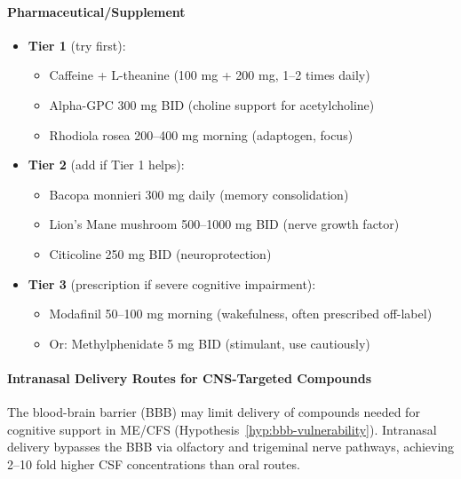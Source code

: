\paragraph{Pharmaceutical/Supplement}
\begin{itemize}
    \item \textbf{Tier 1} (try first):
    \begin{itemize}
        \item Caffeine + L-theanine (100 mg + 200 mg, 1--2 times daily)
        \item Alpha-GPC 300 mg BID (choline support for acetylcholine)
        \item Rhodiola rosea 200--400 mg morning (adaptogen, focus)
    \end{itemize}

    \item \textbf{Tier 2} (add if Tier 1 helps):
    \begin{itemize}
        \item Bacopa monnieri 300 mg daily (memory consolidation)
        \item Lion's Mane mushroom 500--1000 mg BID (nerve growth factor)
        \item Citicoline 250 mg BID (neuroprotection)
    \end{itemize}

    \item \textbf{Tier 3} (prescription if severe cognitive impairment):
    \begin{itemize}
        \item Modafinil 50--100 mg morning (wakefulness, often prescribed off-label)
        \item Or: Methylphenidate 5 mg BID (stimulant, use cautiously)
    \end{itemize}
\end{itemize}

\paragraph{Intranasal Delivery Routes for CNS-Targeted Compounds}

\begin{keypoint}
The blood-brain barrier (BBB) may limit delivery of compounds needed for cognitive support in ME/CFS (Hypothesis~\ref{hyp:bbb-vulnerability}). Intranasal delivery bypasses the BBB via olfactory and trigeminal nerve pathways, achieving 2--10 fold higher CSF concentrations than oral routes.
\end{keypoint}

